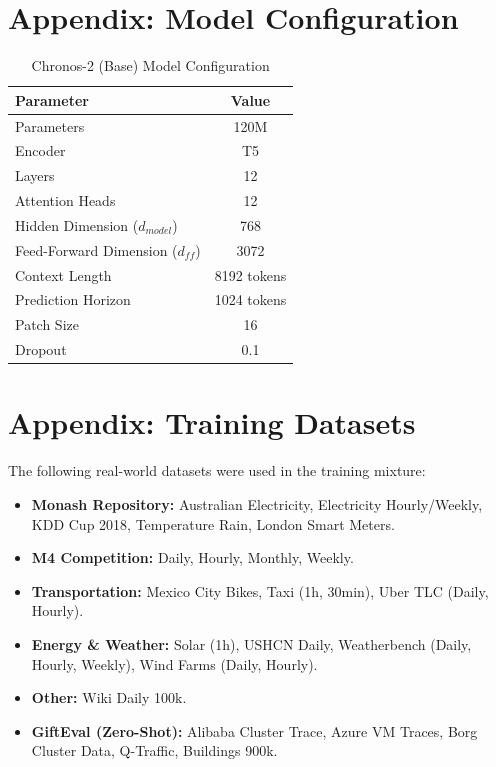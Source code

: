 \documentclass[conference]{IEEEtran}
\begin{document}
\section*{Appendix: Model Configuration}
\begin{table}[htbp]
\caption{Chronos-2 (Base) Model Configuration}
\begin{center}
\begin{tabular}{|l|c|}
\hline
\textbf{Parameter} & \textbf{Value} \\
\hline
Parameters & 120M \\
Encoder & T5 \\
Layers & 12 \\
Attention Heads & 12 \\
Hidden Dimension ($d_{model}$) & 768 \\
Feed-Forward Dimension ($d_{ff}$) & 3072 \\
Context Length & 8192 tokens \\
Prediction Horizon & 1024 tokens \\
Patch Size & 16 \\
Dropout & 0.1 \\
\hline
\end{tabular}
\label{tab:model_config}
\end{center}
\end{table}

\section*{Appendix: Training Datasets}
\label{section:dataset-appendix}
The following real-world datasets were used in the training mixture:
\begin{itemize}
    \item \textbf{Monash Repository:} Australian Electricity, Electricity Hourly/Weekly, KDD Cup 2018, Temperature Rain, London Smart Meters.
    \item \textbf{M4 Competition:} Daily, Hourly, Monthly, Weekly.
    \item \textbf{Transportation:} Mexico City Bikes, Taxi (1h, 30min), Uber TLC (Daily, Hourly).
    \item \textbf{Energy & Weather:} Solar (1h), USHCN Daily, Weatherbench (Daily, Hourly, Weekly), Wind Farms (Daily, Hourly).
    \item \textbf{Other:} Wiki Daily 100k.
    \item \textbf{GiftEval (Zero-Shot):} Alibaba Cluster Trace, Azure VM Traces, Borg Cluster Data, Q-Traffic, Buildings 900k.
\end{itemize}



\end{document}
